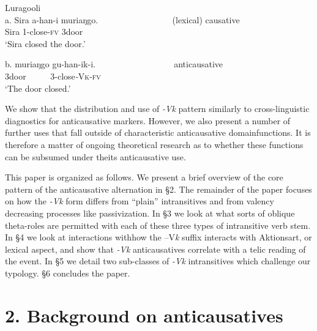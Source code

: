 \documentclass[output=paper]{langsci/langscibook}
\begin{document}
\ea
 {  Luragooli}\\
\gll a.  Sira a-han-i       muriaŋgo.~~~ ~~~ ~~~ ~~~ ~~    (lexical) causative\\
       Sira 1-close-\textsc{fv} 3door\\
\glt ‘Sira closed the door.’
\z

\gll b.  muriaŋgo gu-han-ik-i.~~~ ~~~ ~~~ ~~~ ~~~     anticausative\\
       3door ~~~~~3-close\textit{{}-}\textsc{Vk}{}-\textsc{fv}\\
\glt ‘The door closed.’
\z

We show that the distribution and use of \textit{{}-Vk} pattern similarly to cross-linguistic diagnostics for anticausative markers. However, we also present a number of further uses that fall outside of characteristic anticausative domainfunctions. It is therefore a matter of ongoing theoretical research as to whether these functions can be subsumed under theits anticausative use.

This paper is organized as follows. We present a brief overview of the core pattern of the anticausative alternation in §2. The remainder of the paper focuses on how the \textit{{}-Vk }form differs from “plain” intransitives and from valency decreasing processes like passivization. In §3 we look at what sorts of oblique theta-roles are permitted with each of these three types of intransitive verb stem. In §4 we look at interactions withhow the –V\textit{k }suffix interacts with Aktionsart, or lexical aspect, and show that \textit{{}-Vk} anticausatives correlate with a telic reading of the event. In §5 we detail two sub-classes of \textit{{}-Vk} intransitives which challenge our typology. §6 concludes the paper. 

\chapter{2. Background on anticausatives}
\end{document}
